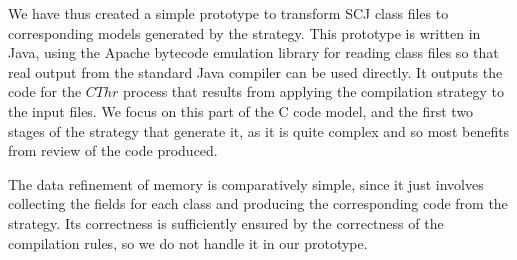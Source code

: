 We have thus created a simple prototype to transform SCJ class files
to corresponding \Circus{} models generated by the strategy.
This prototype is written in Java, using the Apache bytecode emulation
library for reading class files so that real output from the standard
Java compiler can be used directly.
It outputs the \Circus{} code for the $CThr$ process that results from
applying the compilation strategy to the input files.
We focus on this part of the C code model, and the first two stages of
the strategy that generate it, as it is quite complex and so most
benefits from review of the code produced.

The data refinement of memory is comparatively simple, since it just
involves collecting the fields for each class and producing the
corresponding \Circus{} code from the strategy.
Its correctness is sufficiently ensured by the correctness of the
compilation rules, so we do not handle it in our prototype.

